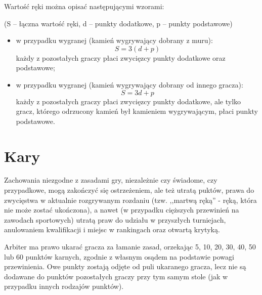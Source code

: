 Wartość ręki można opisać następującymi wzorami:

(S -- łączna wartość ręki, d -- punkty dodatkowe, p -- punkty podstawowe)
\begin{itemize}
  \item w przypadku wygranej  (kamień wygrywający dobrany z muru):
  	\begin{equation*}
		S = 3(d + p)
		\label{zimo}
	\end{equation*}
	każdy z pozostałych graczy płaci zwycięzcy punkty dodatkowe oraz podstawowe;
  \item w przypadku wygranej  (kamień wygrywający dobrany od
  innego gracza):
  	\begin{equation*}
		S = 3d +p
		\label{dian}
	\end{equation*}
	każdy z pozostałych graczy płaci zwycięzcy punkty dodatkowe, ale tylko gracz,
	którego odrzucony kamień był kamieniem wygrywającym, płaci punkty podstawowe.
\end{itemize}

\section{Kary}
\label{penalties}
Zachowania niezgodne z zasadami gry, niezależnie czy świadome, czy przypadkowe,
mogą zakończyć się ostrzeżeniem, ale też utratą puktów, prawa do zwycięstwa w
aktualnie rozgrywanym rozdaniu (tzw. ,,martwą ręką'' - ręką, która nie może
zostać ukończona), a nawet (w przypadku cięższych przewinień na zawodach
sportowych) utratą praw do udziału w przyszłych turniejach, anulowaniem
kwalifikacji i miejsc w rankingach oraz otwartą krytyką.

Arbiter ma prawo ukarać gracza za łamanie zasad, orzekając 5, 10, 20, 30, 40,
50 lub 60 punktów karnych, zgodnie z własnym osądem na podstawie powagi
przewinienia. Owe punkty zostają odjęte od puli ukaranego gracza, lecz nie są
dodawane do punktów pozostałych graczy przy tym samym stole (jak w przypadku
innych rodzajów punktów).

